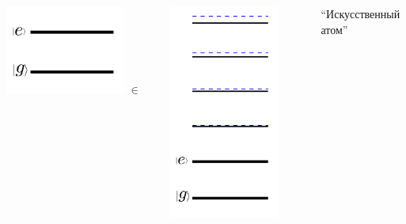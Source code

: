 \documentclass[aspectratio=169, 13pt]{beamer}
\begin{document}
\begin{frame}[c]
\begin{columns}[c]
\includegraphics[width=0.8\textwidth]{two_level_transmon}
\vspace{2cm}
\vspace{-0.8cm}
$\in$


\centering
\includegraphics[width=0.8\textwidth]{many_level_transmon}

\vspace{0.1cm}
``Искусственный атом''

\end{columns}
\end{frame}
\end{document}
